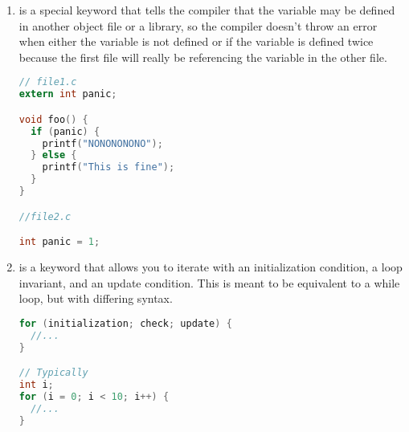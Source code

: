 \begin{enumerate}
\begin{lstlisting}[language=C]
enum day{ monday, tuesday, wednesday,
  thursday, friday, saturday, sunday};

void process_day(enum day foo) {
  switch(foo) {
    case monday:
      printf("Go home!\n"); break;
    // ...
  }
}
\end{lstlisting}

	      It is completely possible to assign enum values to either be different or the same.
        It is not advisable to rely on the compiler for consistent numbering, if you do the above. If you are going to use this abstraction, try not to break it.

\begin{lstlisting}[language=C]
enum day{
  monday = 0,
  tuesday = 0,
  wednesday = 0,
  thursday = 1,
  friday = 10,
  saturday = 10,
  sunday = 0};

void process_day(enum day foo) {
  switch(foo) {
    case monday:
      printf("Go home!\n"); break;
    // ...
  }
}
\end{lstlisting}

	    \item {} is a special keyword that tells the compiler that the variable may be defined in another object file or a library, so the compiler doesn't throw an error when either the variable is not defined or if the variable is defined twice because the first file will really be referencing the variable in the other file.

\begin{lstlisting}[language=C]
// file1.c
extern int panic;

void foo() {
  if (panic) {
    printf("NONONONONO");
  } else {
    printf("This is fine");
  }
}

//file2.c

int panic = 1;
\end{lstlisting}

	    \item {} is a keyword that allows you to iterate with an initialization condition, a loop invariant, and an update condition.
        This is meant to be equivalent to a while loop, but with differing syntax.

\begin{lstlisting}[language=C]
for (initialization; check; update) {
  //...
}

// Typically
int i;
for (i = 0; i < 10; i++) {
  //...
}
\end{lstlisting}


\end{enumerate}
